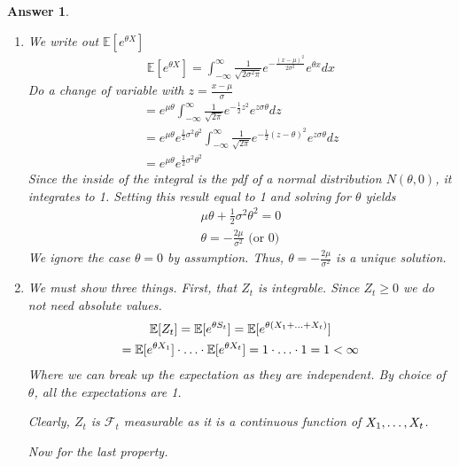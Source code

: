 \documentclass[12pt]{article}
\theoremstyle{colon}
\newtheorem*{answer}{Answer}
\begin{document}
\begin{answer}
  \leavevmode

  \begin{enumerate}[label=\alph*)]
    \item We write out $\mathbb{E}[e^{\theta X}]$
      \begin{gather*}
        \mathbb{E}[e^{\theta X}] = \int_{-\infty}^\infty \frac{1}{\sqrt{2 \sigma^2 \pi}} e^{-\frac{(x-\mu)^2}{2 \sigma^2}} e^{\theta x} dx
      \end{gather*}
      Do a change of variable with $z = \frac{x - \mu}{\sigma}$
      \begin{gather*}
        = e^{\mu \theta} \int_{-\infty}^\infty \frac{1}{\sqrt{2 \pi}} e^{-\frac{1}{2}z^2} e^{z \sigma \theta} dz \\
        = e^{\mu \theta} e^{\frac{1}{2} \sigma^2 \theta^2 } \int_{-\infty}^\infty \frac{1}{\sqrt{2 \pi}} e^{-\frac{1}{2}(z-\theta)^2} e^{z \sigma \theta} dz \\
        = e^{\mu \theta} e^{\frac{1}{2} \sigma^2 \theta^2 }
      \end{gather*}
      Since the inside of the integral is the pdf of a normal distribution $N(\theta, 0)$, it integrates to 1. Setting this result equal to 1 and solving for $\theta$ yields
      \begin{gather*}
        \mu \theta + \frac{1}{2} \sigma^2 \theta^2 = 0 \\
        \theta = -\frac{2 \mu}{\sigma^2} \text{ (or 0)}
      \end{gather*}
      We ignore the case $\theta = 0$ by assumption. Thus, $\theta = -\frac{2 \mu}{\sigma^2}$ is a unique solution.
    \item We must show three things. First, that $Z_t$ is integrable. Since $Z_t \geq 0$ we do not need absolute values.
      \begin{gather*}
        \mathbb{E}[Z_t] = \mathbb{E}[e^{\theta S_t}] = \mathbb{E}[e^{\theta (X_1 + \mathellipsis + X_t)}] \\
        = \mathbb{E}[e^{\theta X_1}] \cdot \mathellipsis \cdot \mathbb{E}[e^{\theta X_t}] = 1 \cdot \mathellipsis \cdot 1 = 1 < \infty
      \end{gather*}
      Where we can break up the expectation as they are independent. By choice of $\theta$, all the expectations are 1.

      Clearly, $Z_t$ is $\mathcal{F}_t$ measurable as it is a continuous function of $X_1, \mathellipsis, X_t$.

      Now for the last property.


\end{enumerate}
\end{answer}
\end{document}
